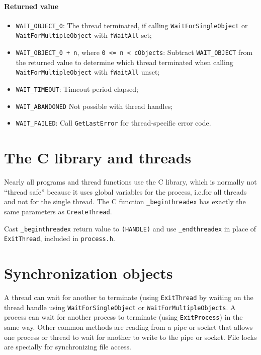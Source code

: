 \paragraph{Returned value}
\begin{itemize}
\item \texttt{WAIT\_OBJECT\_0}: The thread terminated, if calling \texttt{WaitForSingleObject} or \texttt{WaitForMultipleObject} with \texttt{fWaitAll} set;
\item \texttt{WAIT\_OBJECT\_0 + n}, where \texttt{0 <= n < cObjects}: Subtract \texttt{WAIT\_OBJECT} from the returned value to determine which thread terminated when calling \texttt{WaitForMultipleObject} with \texttt{fWaitAll} unset;
\item \texttt{WAIT\_TIMEOUT}: Timeout period elapsed;
\item \texttt{WAIT\_ABANDONED} Not possible with thread handles;
\item \texttt{WAIT\_FAILED}: Call \texttt{GetLastError} for thread-specific error code.
\end{itemize}

\section{The C library and threads}
Nearly all programs and thread functions use the C library, which is normally not ``thread safe'' because it uses global variables for the process, i.e.\@ for all threads and not for the single thread. The C function \texttt{\_beginthreadex} has exactly the same parameters as \texttt{CreateThread}.

Cast \texttt{\_beginthreadex} return value to \texttt{(HANDLE)} and use \texttt{\_endthreadex} in place of \texttt{ExitThread}, included in \texttt{process.h}.

\section{Synchronization objects}
A thread can wait for another to terminate (using \texttt{ExitThread} by waiting on the thread handle using \texttt{WaitForSingleObject} or \texttt{WaitForMultipleObjects}. A process can wait for another process to terminate (using \texttt{ExitProcess}) in the same way. Other common methods are reading from a pipe or socket that allows one process or thread to wait for another to write to the pipe or socket. File locks are specially for synchronizing file access.

